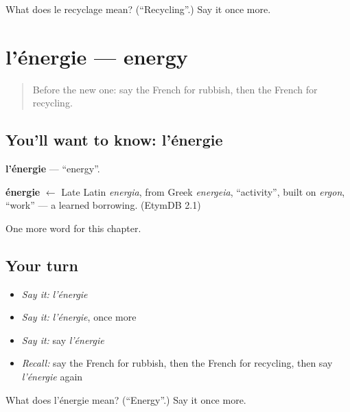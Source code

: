 \begin{tcolorbox}[breakable,colback=teal!4,colframe=teal!35!black,title={Before you move on}]
What does le recyclage mean? (\textquotedblleft{}Recycling\textquotedblright{}.) Say it once more.
\end{tcolorbox}
\section[l'énergie]{l'énergie — energy}

\label{lesson:FR-C255-energie}



\begin{quote}
Before the new one: say the French for rubbish, then the French for recycling.
\end{quote}

\subsection*{You'll want to know: l'énergie}
\textbf{l'énergie} — \textquotedblleft{}energy\textquotedblright{}.

\begin{cousinweb}
\textbf{énergie} $\leftarrow$ Late Latin \emph{energia}, from Greek \emph{energeia}, \textquotedblleft{}activity\textquotedblright{}, built on \emph{ergon}, \textquotedblleft{}work\textquotedblright{} — a learned borrowing. (EtymDB 2.1)
\end{cousinweb}

\begin{grammarlens}[title={What you've built}]
One more word for this chapter.
\end{grammarlens}

\subsection*{Your turn}
\begin{itemize}
\raggedright
  \item \emph{Say it:} \emph{l'énergie}
  \item \emph{Say it:} \emph{l'énergie}, once more
  \item \emph{Say it:} say \emph{l'énergie}
  \item \emph{Recall:} say the French for rubbish, then the French for recycling, then say \emph{l'énergie} again
\end{itemize}

\begin{tcolorbox}[breakable,colback=teal!4,colframe=teal!35!black,title={Before you move on}]
What does l'énergie mean? (\textquotedblleft{}Energy\textquotedblright{}.) Say it once more.
\end{tcolorbox}
